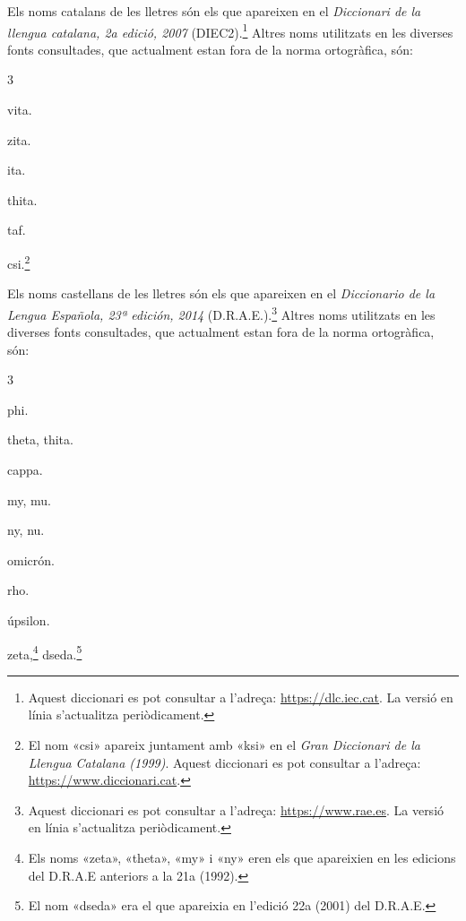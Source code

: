 Els noms catalans de les lletres són els que apareixen en el \textit{Diccionari de la llengua catalana, 2a edició, 2007} (DIEC2).\footnote{Aquest diccionari es pot consultar a l'adreça: \href{http://dlc.iec.cat/}{https:/\!\!/dlc.iec.cat}. La versió en línia s'actualitza periòdicament.} Altres noms utilitzats en
les diverses fonts consultades, que actualment estan fora de la norma ortogràfica, són:
\begin{multicols}{3}
	\begin{list}{}
		{\setlength{\labelwidth}{16mm} \setlength{\leftmargin}{16mm} \setlength{\labelsep}{2mm}}
		\item[$B$, $\beta:$] vita.
		\item[$Z$, $\zeta:$] zita.
		\item[$H$, $\eta:$] ita.
		\item[$\Theta$, $\theta:$] thita.
		\item[$T$, $\tau:$] taf.
		\item[$\Xi$, $\xi$:] csi.\footnote{El nom «csi» apareix juntament amb «ksi» en el \textit{Gran Diccionari de la Llengua Catalana (1999)}. Aquest diccionari es pot consultar a l'adreça:  \href{https://www.diccionari.cat/}{https:/\!\!/www.diccionari.cat}.}
	\end{list}
\end{multicols}

Els noms castellans de les lletres són els que apareixen en el \textit{Diccionario de la Lengua Española, 23ª
	edición, 2014} (D.R.A.E.).\footnote{Aquest diccionari es pot consultar a l'adreça:  \href{https://www.rae.es/}{https:/\!\!/www.rae.es}. La versió en línia s'actualitza periòdicament.} Altres noms utilitzats en les diverses fonts
consultades, que actualment estan fora de la norma ortogràfica, són:
\begin{multicols}{3}
	\begin{list}{}
		{\setlength{\labelwidth}{16mm} \setlength{\leftmargin}{16mm} \setlength{\labelsep}{2mm}}
		\item[$\Phi$, $\phi:$] phi.
		\item[$\Theta$, $\theta:$] theta, thita.
		\item[$K$, $\kappa:$] cappa.
		\item[$M$, $\mu:$] my, mu.
		\item[$N$, $\nu:$] ny, nu.
		\item[$O$$, $o:] omicrón.
		\item[$P$, $\rho:$] rho.
		\item[$\Upsilon$, $\upsilon:$] úpsilon.
		\item[$Z$, $\zeta:$]  zeta,\footnote{\label{fn:zeta}Els noms «zeta», «theta», «my» i «ny» eren els que apareixien en les edicions
			del D.R.A.E anteriors a la 21a (1992).} dseda.\footnote{El nom «dseda» era el que apareixia en l'edició 22a (2001) del D.R.A.E.}
	\end{list}
\end{multicols}

